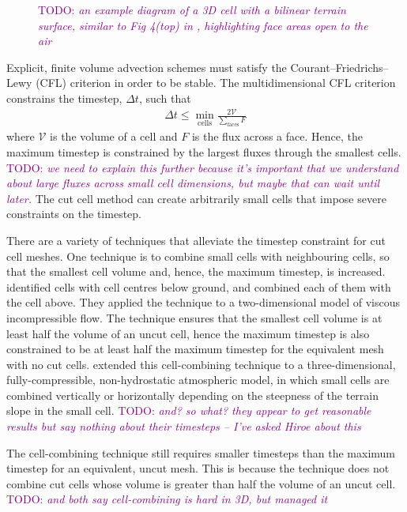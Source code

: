 \documentclass{article}
\newcommand{\TODO}[1]{\textcolor{purple}{TODO: \emph{#1}}}
\begin{document}
\begin{figure}
	\caption{\TODO{an example diagram of a 3D cell with a bilinear terrain surface, similar to Fig 4(top) in \cite{walko-avissar2008b}, highlighting face areas open to the air}}
	\label{fig:cut-cell}
\end{figure}

Explicit, finite volume advection schemes must satisfy the Courant--Friedrichs--Lewy (CFL) criterion in order to be stable.  The multidimensional CFL criterion constrains the timestep, $\Delta t$, such that
\begin{align}
	\Delta t \leq \min_\mathrm{cells} \frac{2\mathcal{V}}{\sum_\mathrm{faces} F}
\end{align}
where $\mathcal{V}$ is the volume of a cell and $F$ is the flux across a face.  Hence, the maximum timestep is constrained by the largest fluxes through the smallest cells.  \TODO{we need to explain this further because it's important that we understand about large fluxes across small cell dimensions, but maybe that can wait until later.}
The cut cell method can create arbitrarily small cells that impose severe constraints on the timestep.

There are a variety of techniques that alleviate the timestep constraint for cut cell meshes.  One technique is to combine small cells with neighbouring cells, so that the smallest cell volume and, hence, the maximum timestep, is increased.  \citet{ye1999} identified cells with cell centres below ground, and combined each of them with the cell above.  They applied the technique to a two-dimensional model of viscous incompressible flow.  The technique ensures that the smallest cell volume is at least half the volume of an uncut cell, hence the maximum timestep is also constrained to be at least half the maximum timestep for the equivalent mesh with no cut cells.
\citet{yamazaki2016} extended this cell-combining technique to a three-dimensional, fully-compressible, non-hydrostatic atmospheric model, in which small cells are combined vertically or horizontally depending on the steepness of the terrain slope in the small cell.  \TODO{and? so what? they appear to get reasonable results but say nothing about their timesteps -- I've asked Hiroe about this}

The cell-combining technique still requires smaller timesteps than the maximum timestep for an equivalent, uncut mesh.  This is because the technique does not combine cut cells whose volume is greater than half the volume of an uncut cell.
\TODO{\citet{kirkpatrick2003} and \citet{berger-helzel2012} both say cell-combining is hard in 3D, but \citet{yamazaki2016} managed it}
\end{document}
